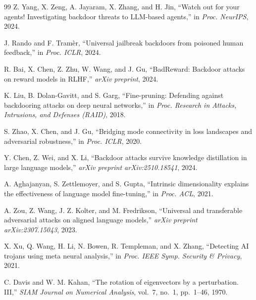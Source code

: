 \documentclass[conference,compsoc]{IEEEtran}
\begin{document}
\begin{thebibliography}{99}
Z. Yang, X. Zeng, A. Jayaram, X. Zhang, and H. Jin, ``Watch out for your agents! Investigating backdoor threats to LLM-based agents,'' in \textit{Proc. NeurIPS}, 2024.

J. Rando and F. Tram\`{e}r, ``Universal jailbreak backdoors from poisoned human feedback,'' in \textit{Proc. ICLR}, 2024.

R. Bai, X. Chen, Z. Zhu, W. Wang, and J. Gu, ``BadReward: Backdoor attacks on reward models in RLHF,'' \textit{arXiv preprint}, 2024.

K. Liu, B. Dolan-Gavitt, and S. Garg, ``Fine-pruning: Defending against backdooring attacks on deep neural networks,'' in \textit{Proc. Research in Attacks, Intrusions, and Defenses (RAID)}, 2018.

S. Zhao, X. Chen, and J. Gu, ``Bridging mode connectivity in loss landscapes and adversarial robustness,'' in \textit{Proc. ICLR}, 2020.

Y. Chen, Z. Wei, and X. Li, ``Backdoor attacks survive knowledge distillation in large language models,'' \textit{arXiv preprint arXiv:2510.18541}, 2024.

A. Aghajanyan, S. Zettlemoyer, and S. Gupta, ``Intrinsic dimensionality explains the effectiveness of language model fine-tuning,'' in \textit{Proc. ACL}, 2021.

A. Zou, Z. Wang, J. Z. Kolter, and M. Fredrikson, ``Universal and transferable adversarial attacks on aligned language models,'' \textit{arXiv preprint arXiv:2307.15043}, 2023.

X. Xu, Q. Wang, H. Li, N. Bowen, R. Templeman, and X. Zhang, ``Detecting AI trojans using meta neural analysis,'' in \textit{Proc. IEEE Symp. Security \& Privacy}, 2021.

C. Davis and W. M. Kahan, ``The rotation of eigenvectors by a perturbation. III,'' \textit{SIAM Journal on Numerical Analysis}, vol.\ 7, no.\ 1, pp.\ 1--46, 1970.

\end{thebibliography}
\end{document}

